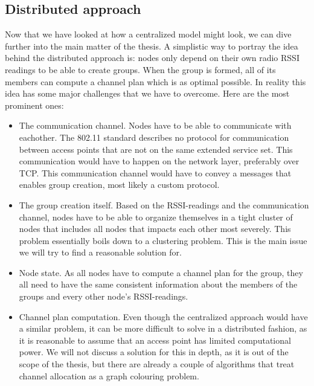 \subsection{Distributed approach}
Now that we have looked at how a centralized model might look, we can dive further into the main matter of the thesis. A simplistic way to portray the idea behind
the distributed approach is: nodes only depend on their own radio RSSI readings to be able to create groups. When the group is formed, all of its members can
compute a channel plan which is as optimal possible. In reality this idea has some major challenges that we have to overcome. Here are the most prominent ones: 
\begin{itemize}
	\item The communication channel. Nodes have to be able to communicate with eachother. The 802.11 standard describes no protocol for communication between access points that are not on the same extended service set. This communication would have to happen on the network layer, preferably over TCP. This communication channel would have to convey a messages that enables group creation,
		most likely a custom protocol. 
	\item The group creation itself. Based on the RSSI-readings and the communication channel, nodes have to be able to organize themselves in a tight cluster of nodes that
		includes all nodes that impacts each other most severely. This problem essentially boils down to a clustering problem. This is the main issue we will
		try to find a reasonable solution for. 
	\item Node state. As all nodes have to compute a channel plan for the group, they all need to have the same consistent information about the members of the groups
		and every other node's RSSI-readings. 
	\item Channel plan computation. Even though the centralized approach would have a similar problem, it can be more difficult to solve in a distributed fashion, as 
		it is reasonable to assume that an access point has limited computational power. We will not discuss a solution for this in depth, as it is out of the scope
		of the thesis, but there are already a couple of algorithms that treat channel allocation as a graph colouring problem. 
\end{itemize}

